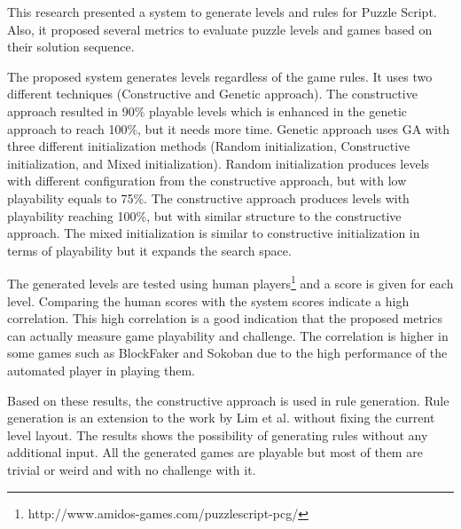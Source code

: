 This research presented a system to generate levels and rules for Puzzle Script. Also, it proposed several metrics to evaluate puzzle levels and games based on their solution sequence.\\\par

The proposed system generates levels regardless of the game rules. It uses two different techniques (Constructive and Genetic approach). The constructive approach resulted in 90\% playable levels which is enhanced in the genetic approach to reach 100\%, but it needs more time. Genetic approach uses GA with three different initialization methods (Random initialization, Constructive initialization, and Mixed initialization). Random initialization produces levels with different configuration from the constructive approach, but with low playability equals to 75\%.  The constructive approach produces levels with playability reaching 100\%, but with similar structure to the constructive approach. The mixed initialization is similar to constructive initialization in terms of playability but it expands the search space.\\\par

The generated levels are tested using human players\footnote{http://www.amidos-games.com/puzzlescript-pcg/} and a score is given for each level. Comparing the human scores with the system scores indicate a high correlation. This high correlation is a good indication that the proposed metrics can actually measure game playability and challenge. The correlation is higher in some games such as BlockFaker and Sokoban due to the high performance of the automated player in playing them.\\\par

Based on these results, the constructive approach is used in rule generation. Rule generation is an extension to the work by Lim et al.\cite{puzzleScriptGeneration} without fixing the current level layout. The results shows the possibility of generating rules without any additional input. All the generated games are playable but most of them are trivial or weird and with no challenge with it.\\\par

